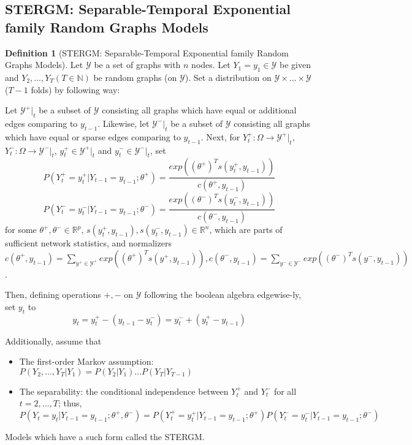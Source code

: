 \documentclass[aspectratio=169,ignorenonframetext,9pt]{beamer}
\theoremstyle{plain}
\theoremstyle{definition}
\newtheorem{defn}{Definition}[section]
\begin{document}
\subsection{STERGM: Separable-Temporal Exponential family Random Graphs Models}
\begin{defn}[STERGM: Separable-Temporal Exponential family Random Graphs Models]
    Let $\mathcal{Y}$ be a set of graphs with $n$ nodes. 
    Let $Y_1=y_1 \in \mathcal{Y}$ be given and $Y_2,...,Y_T (T\in\mathbb{N})$ be random graphs (on $\mathcal{Y}$).
    Set a distribution on $\mathcal{Y}\times ... \times \mathcal{Y}$ ($T-1$ folds) by following way:

    Let $\mathcal{Y}^+|_t$ be a subset of $\mathcal{Y}$ consisting all graphs which have equal or additional edges comparing to $y_{t-1}$.
    Likewise, let $\mathcal{Y}^-|_t$ be a subset of $\mathcal{Y}$ consisting all graphs which have equal or sparse edges comparing to $y_{t-1}$.
    Next, for $Y_t^+: \Omega \to\mathcal{Y}^+|_t$, $Y_t^-: \Omega \to\mathcal{Y}^-|_t$, $y_t^+ \in \mathcal{Y}^+|_t$ and $y_t^- \in \mathcal{Y}^-|_t$, set
    \[P(Y_t^+=y_t^+|Y_{t-1}=y_{t-1};\theta^+) = \frac{exp((\theta^+)^{T}s(y_t^+, y_{t-1}))}{c(\theta^+, y_{t-1})}\]
    \[P(Y_t^-=y_t^-|Y_{t-1}=y_{t-1};\theta^-) = \frac{exp((\theta^-)^{T}s(y_t^-, y_{t-1}))}{c(\theta^-, y_{t-1})}\]
    for some $\theta^+,\theta^-\in\mathbb{R}^p$, $s(y_t^+, y_{t-1}), s(y_t^-, y_{t-1})\in\mathbb{R}^n$, which are parts of sufficient network statistics,
    and normalizers $c(\theta^+, y_{t-1})=\sum_{y^+\in\mathcal{Y}^+}exp((\theta^+)^{T}s(y^+, y_{t-1})), c(\theta^-, y_{t-1})=\sum_{y^-\in\mathcal{Y}^-}exp((\theta^-)^{T}s(y^-, y_{t-1}))$.
    
    Then, defining operations $+,-$ on $\mathcal{Y}$ following the boolean algebra edgewise-ly, set $y_t$ to
    \[y_t=y_t^+ - (y_{t-1} - y_t^-) = y_t^- + (y_t^+ - y_{t-1})\]
    
    Additionally, assume that
    \begin{itemize}
        \item The first-order Markov assumption: $P(Y_2,...,Y_T|Y_1)=P(Y_2|Y_1)...P(Y_T|Y_{T-1})$
        \item The separability: the conditional independence between $Y_t^+$ and $Y_t^-$ for all $t=2,...,T$;
            thus, \(P(Y_t=y_t|Y_{t-1}=y_{t-1};\theta^+,\theta^-)=P(Y_t^+=y_t^+|Y_{t-1}=y_{t-1};\theta^+)P(Y_t^-=y_t^-|Y_{t-1}=y_{t-1};\theta^-)\)
    \end{itemize}
    Models which have a such form called the STERGM.
\end{defn}
\end{document}
